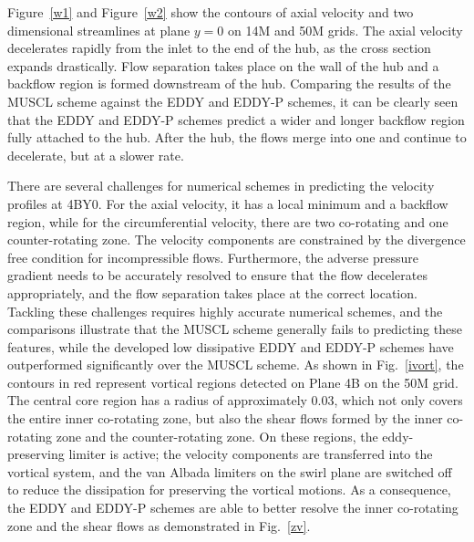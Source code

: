 Figure~\ref{w1} and Figure~\ref{w2} show the contours of axial velocity and two dimensional streamlines at plane $y=0$ on 14M and 50M grids. The axial velocity decelerates rapidly from the inlet to the end of the hub, as the cross section expands drastically. Flow separation takes place on the wall of the hub and a backflow region is formed downstream of the hub. Comparing the results of the MUSCL scheme against the EDDY and EDDY-P schemes, it can be clearly seen that the EDDY and EDDY-P schemes predict a wider and longer backflow region fully attached to the hub. After the hub, the flows merge into one and continue to decelerate, but at a slower rate.

There are several challenges for numerical schemes in predicting the velocity profiles at 4BY0. For the axial velocity, it has a local minimum and a backflow region, while for the circumferential velocity, there are two co-rotating and one counter-rotating zone. The velocity components are constrained by the divergence free condition for incompressible flows. Furthermore, the adverse pressure gradient needs to be accurately resolved to ensure that the flow decelerates appropriately, and the flow separation takes place at the correct location. Tackling these challenges requires highly accurate numerical schemes, and the comparisons illustrate that the MUSCL scheme generally fails to predicting these features, while the developed low dissipative EDDY and EDDY-P schemes have outperformed significantly over the MUSCL scheme. As shown in Fig.~\ref{ivort}, the contours in red represent vortical regions detected on Plane 4B on the 50M grid. The central core region has a radius of approximately 0.03, which not only covers the entire inner co-rotating zone, but also the shear flows formed by the inner co-rotating zone and the counter-rotating zone. On these regions, the eddy-preserving limiter is active; the velocity components are transferred into the vortical system, and the van Albada limiters on the swirl plane are switched off to reduce the dissipation for preserving the vortical motions. As a consequence, the EDDY and EDDY-P schemes are able to better resolve the inner co-rotating zone and the shear flows as demonstrated in Fig.~\ref{zv}.
